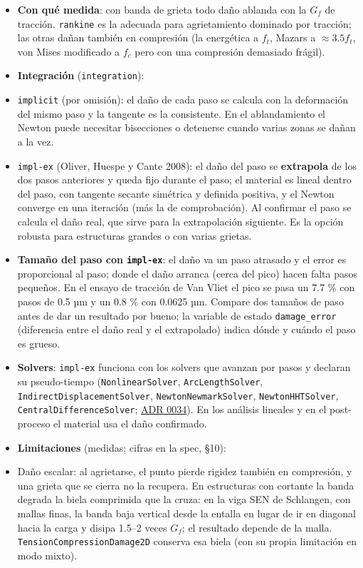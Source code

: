 \documentclass[11pt,oneside]{report}
\begin{document}
\begin{itemize}
  \item \textbf{Con qué medida}: con banda de grieta todo daño ablanda con la $G_f$ de tracción. \texttt{rankine} es la adecuada para agrietamiento dominado por tracción; las otras dañan también en compresión (la energética a $f_t$, Mazars a $\approx 3.5 f_t$, von Mises modificado a $f_c$ pero con una compresión demasiado frágil).
  \item \textbf{Integración} (\texttt{integration}):
  \item \texttt{implicit} (por omisión): el daño de cada paso se calcula con la deformación del mismo paso y la tangente es la consistente. En el ablandamiento el Newton puede necesitar bisecciones o detenerse cuando varias zonas se dañan a la vez.
  \item \texttt{impl-ex} (Oliver, Huespe y Cante 2008): el daño del paso se \textbf{extrapola} de los dos pasos anteriores y queda fijo durante el paso; el material es lineal dentro del paso, con tangente secante simétrica y definida positiva, y el Newton converge en una iteración (más la de comprobación). Al confirmar el paso se calcula el daño real, que sirve para la extrapolación siguiente. Es la opción robusta para estructuras grandes o con varias grietas.
  \item \textbf{Tamaño del paso con \texttt{impl-ex}}: el daño va un paso atrasado y el error es proporcional al paso; donde el daño arranca (cerca del pico) hacen falta pasos pequeños. En el ensayo de tracción de Van Vliet el pico se pasa un 7.7 \% con pasos de 0.5 µm y un 0.8 \% con 0.0625 µm. Compare dos tamaños de paso antes de dar un resultado por bueno; la variable de estado \texttt{damage\_error} (diferencia entre el daño real y el extrapolado) indica dónde y cuándo el paso es grueso.
  \item \textbf{Solvers}: \texttt{impl-ex} funciona con los solvers que avanzan por pasos y declaran su pseudo-tiempo (\texttt{NonlinearSolver}, \texttt{ArcLengthSolver}, \texttt{IndirectDisplacementSolver}, \texttt{NewtonNewmarkSolver}, \texttt{NewtonHHTSolver}, \texttt{CentralDifferenceSolver}; \href{https://github.com/jretamav/solidum-fem/blob/main/docs/adr/0034-pseudo-tiempo-de-los-solvers-incrementales.md}{ADR 0034}). En los análisis lineales y en el post-proceso el material usa el daño confirmado.
  \item \textbf{Limitaciones} (medidas; cifras en la spec, §10):
  \item Daño escalar: al agrietarse, el punto pierde rigidez también en compresión, y una grieta que se cierra no la recupera. En estructuras con cortante la banda degrada la biela comprimida que la cruza: en la viga SEN de Schlangen, con mallas finas, la banda baja vertical desde la entalla en lugar de ir en diagonal hacia la carga y disipa 1.5--2 veces $G_f$; el resultado depende de la malla. \texttt{TensionCompressionDamage2D} conserva esa biela (con su propia limitación en modo mixto).

\end{itemize}
\end{document}
